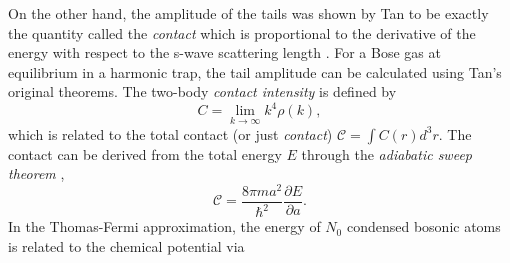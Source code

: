 	On the other hand, the amplitude of the tails was shown by Tan to be exactly the quantity called the \emph{contact} which is proportional to the derivative of the energy with respect to the s-wave scattering length \cite{Tan08_momentum, Braaten11}.
	For a Bose gas at equilibrium in a harmonic trap, the tail amplitude can be calculated using Tan's original theorems. The two-body \emph{contact intensity} is defined by \cite{Tan08_momentum,Braaten11}
	\begin{equation}
		C = \lim_{k\rightarrow\infty}k^4\rho(k),
		\label{eqn:MomentumDef}
	\end{equation}
	which is related to the total contact (or just \emph{contact})  $\mathcal{C} = \int C(r) d^3 r$.
	The contact can be derived from the total energy $E$ through the \emph{adiabatic sweep theorem} \cite{Tan08_energetics},
	\begin{equation}
		\mathcal{C} = \frac{8\pi m a^2}{\hbar^2}\frac{\partial E}{\partial a}.
		\label{eqn:sweep_theorem}
	\end{equation}
	In the Thomas-Fermi approximation, the energy of $N_0$ condensed bosonic atoms is related to the chemical potential via
